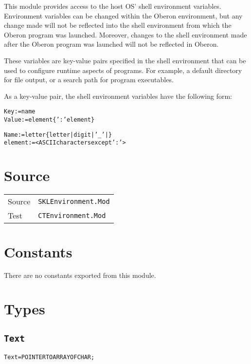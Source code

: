 
This module provides access to the host OS' shell environment
variables.  Environment variables can be changed within the Oberon
environment, but any change made will not be reflected into the shell
environment from which the Oberon program was launched.  Moreover,
changes to the shell environment made after the Oberon program was
launched will not be reflected in Oberon.

These variables are key-value pairs specified in the shell
environment that can be used to configure runtime aspects of programs.
For example, a default directory for file output, or a search path for
program executables.

As a key-value pair, the shell environment variables have the
following form:

\begin{alltt}
  Key     := name
  Value   := element \{ ':' element \}

  Name    := letter \{ letter | digit | '_' | \}
  element := <ASCII characters except ':'>
\end{alltt}

\section{Source}

\begin{tabularx}{\textwidth}{lX}
  Source & \texttt{SKLEnvironment.Mod} \\
  Test & \texttt{CTEnvironment.Mod} \\
\end{tabularx}

\section{Constants}

There are no constants exported from this module.

\section{Types}
\subsection{\texttt{Text}}\label{environment:text}
\begin{alltt}
Text = POINTER TO ARRAY OF CHAR;
\end{alltt}

